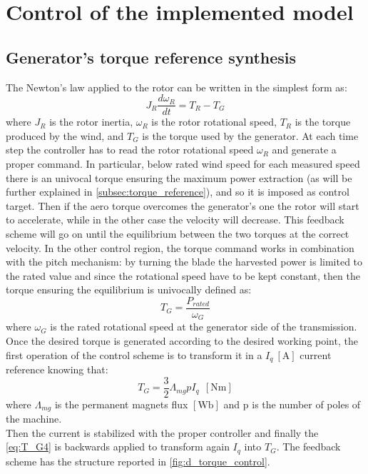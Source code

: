\newpage
\section{Control of the implemented model}\label{sec:c_basic_model_control}

\subsection{Generator's torque reference synthesis}\label{subsec:torque_reference}
The Newton's law applied to the rotor can be written in the simplest form as:
\begin{equation}
    J_R\frac{d\omega_R}{dt}=T_R-T_G
    \label{eq:simple_dynamic}
\end{equation}
where $J_R$ is the rotor inertia, $\omega_R$ is the rotor rotational speed, $T_R$ is the torque produced by the wind, and $T_G$ is the torque used by the generator. At each time step the controller has to read the rotor rotational speed $\omega_R$ and generate a proper command. In particular, below rated wind speed for each measured speed there is an univocal torque ensuring the maximum power extraction (as will be further explained in \autoref{subsec:torque_reference}), and so it is imposed as control target. Then if the aero torque overcomes the generator's one the rotor will start to accelerate, while in the other case the velocity will decrease. This feedback scheme will go on until the equilibrium between the two torques at the correct velocity. In the other control region, the torque command works in combination with the pitch mechanism: by turning the blade the harvested power is limited to the rated value and since the rotational speed have to be kept constant, then the torque ensuring the equilibrium is univocally defined as: 
\begin{equation}
    T_G=\frac{P_{rated}}{\omega_G}
    \label{eq:simple_torque}
\end{equation}
where $\omega_G$ is the rated rotational speed at the generator side of the transmission. \\

Once the desired torque is generated according to the desired working point, the first operation of the control scheme is to transform it in a $I_q \ \left[\si{\ampere}\right]$ current reference knowing that:
\begin{equation}
    T_G = \frac{3}{2}\Lambda_{mg} p I_q \ \ \left[\si{\newton\meter}\right]
    \label{eq:T_G4}
\end{equation}
where $\Lambda_{mg}$ is the permanent magnets flux $\left[\si{\weber}\right]$ and p is the number of poles of the machine.\\
Then the current is stabilized with the proper controller and finally the \autoref{eq:T_G4} is backwards applied to transform again $I_q$ into $T_G$. The feedback scheme has the structure reported in \autoref{fig:d_torque_control}.

